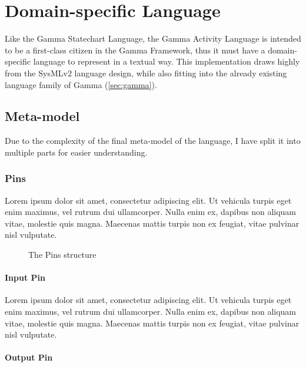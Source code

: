 \clearpage\section{Domain-specific Language}

Like the Gamma Statechart Language, the Gamma Activity Language is intended to be a first-class citizen in the Gamma Framework, thus it must have a domain-specific language to represent in a textual way. This implementation draws highly from the SysMLv2 \cite{omg_sysml_v2} language design, while also fitting into the already existing language family of Gamma (\autoref{sec:gamma}).

\subsection{Meta-model}

Due to the complexity of the final meta-model of the language, I have split it into multiple parts for easier understanding.

\subsubsection{Pins}\label{ssec:pins}

Lorem ipsum dolor sit amet, consectetur adipiscing elit. Ut vehicula turpis eget enim maximus, vel rutrum dui ullamcorper. Nulla enim ex, dapibus non aliquam vitae, molestie quis magna. Maecenas mattis turpis non ex feugiat, vitae pulvinar nisl vulputate.

\begin{figure}[!ht]
	\centering
	
	\caption{The Pins structure}
	\label{fig:pins}
\end{figure}

\paragraph{Input Pin}

Lorem ipsum dolor sit amet, consectetur adipiscing elit. Ut vehicula turpis eget enim maximus, vel rutrum dui ullamcorper. Nulla enim ex, dapibus non aliquam vitae, molestie quis magna. Maecenas mattis turpis non ex feugiat, vitae pulvinar nisl vulputate.

\paragraph{Output Pin}

